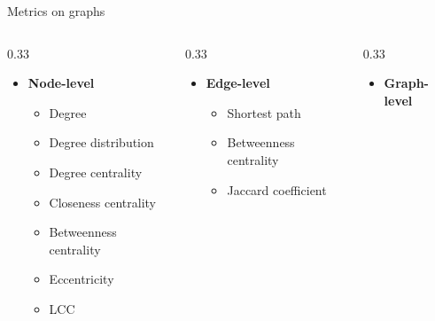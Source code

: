 \documentclass[aspectratio=169]{beamer}
\renewcommand{\alert}[1]{\textbf{\color{swufe}#1}}
\begin{document}
    \begin{frame}{Metrics on graphs}
        \begin{columns}[t] %
            \begin{column}{0.33\textwidth}
                \begin{itemize}
                    \item \alert{Node-level}
                    \begin{itemize}
                        \item Degree
                        \item Degree distribution
                        \item Degree centrality
                        \item Closeness centrality
                        \item Betweenness centrality
                        \item Eccentricity
                        \item LCC
                    \end{itemize}
                \end{itemize}
            \end{column}
            \begin{column}{0.33\textwidth}
                \begin{itemize}
                    \item \alert{Edge-level}
                    \begin{itemize}
                        \item Shortest path
                        \item Betweenness centrality
                        \item Jaccard coefficient
                    \end{itemize}
                \end{itemize}
            \end{column}
            \begin{column}{0.33\textwidth}
                \begin{itemize}
                    \item \alert{Graph-level}
                    \begin{itemize}

\end{itemize}
\end{itemize}
\end{column}
\end{columns}
\end{frame}
\end{document}
